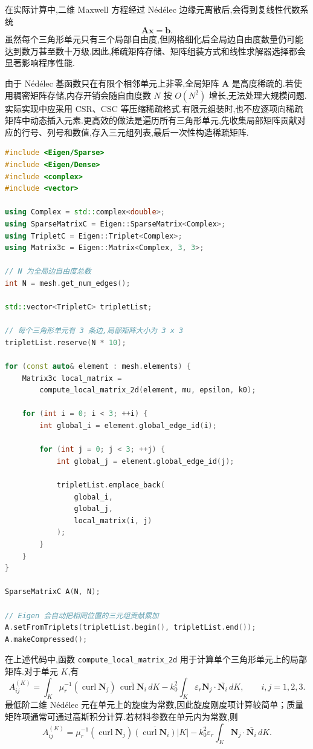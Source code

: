 \documentclass[12pt,hyperref,a4paper,UTF8,twoside]{ctexart}
\newcommand{\curl}{\operatorname{curl}}
\begin{document}
在实际计算中,二维 Maxwell 方程经过 Nédélec 边缘元离散后,会得到复线性代数系统
\[
\bm{A}\bm{x}=\bm{b}.
\]
虽然每个三角形单元只有三个局部自由度,但网格细化后全局边自由度数量仍可能达到数万甚至数十万级.因此,稀疏矩阵存储、矩阵组装方式和线性求解器选择都会显著影响程序性能.

由于 Nédélec 基函数只在有限个相邻单元上非零,全局矩阵 $\bm{A}$ 是高度稀疏的.若使用稠密矩阵存储,内存开销会随自由度数 $N$ 按 $O(N^2)$ 增长,无法处理大规模问题.实际实现中应采用 CSR、CSC 等压缩稀疏格式.有限元组装时,也不应逐项向稀疏矩阵中动态插入元素.更高效的做法是遍历所有三角形单元,先收集局部矩阵贡献对应的行号、列号和数值,存入三元组列表,最后一次性构造稀疏矩阵.

\begin{lstlisting}[language=C++, caption={基于 Eigen 库的二维 Nédélec 边缘元稀疏矩阵组装伪代码}]
#include <Eigen/Sparse>
#include <Eigen/Dense>
#include <complex>
#include <vector>

using Complex = std::complex<double>;
using SparseMatrixC = Eigen::SparseMatrix<Complex>;
using TripletC = Eigen::Triplet<Complex>;
using Matrix3c = Eigen::Matrix<Complex, 3, 3>;

// N 为全局边自由度总数
int N = mesh.get_num_edges();

std::vector<TripletC> tripletList;

// 每个三角形单元有 3 条边,局部矩阵大小为 3 x 3
tripletList.reserve(N * 10);

for (const auto& element : mesh.elements) {
    Matrix3c local_matrix =
        compute_local_matrix_2d(element, mu, epsilon, k0);

    for (int i = 0; i < 3; ++i) {
        int global_i = element.global_edge_id(i);

        for (int j = 0; j < 3; ++j) {
            int global_j = element.global_edge_id(j);

            tripletList.emplace_back(
                global_i,
                global_j,
                local_matrix(i, j)
            );
        }
    }
}

SparseMatrixC A(N, N);

// Eigen 会自动把相同位置的三元组贡献累加
A.setFromTriplets(tripletList.begin(), tripletList.end());
A.makeCompressed();
\end{lstlisting}

在上述代码中,函数 \texttt{compute\_local\_matrix\_2d} 用于计算单个三角形单元上的局部矩阵.对于单元 $K$,有
\[
A_{ij}^{(K)}
=
\int_K
\mu_r^{-1}
(\curl\bm{N}_j)\,\overline{\curl\bm{N}_i}\,dK
-
k_0^2
\int_K
\varepsilon_r
\bm{N}_j\cdot\overline{\bm{N}_i}\,dK,
\qquad i,j=1,2,3.
\]
最低阶二维 Nédélec 元在单元上的旋度为常数,因此旋度刚度项计算较简单；质量矩阵项通常可通过高斯积分计算.若材料参数在单元内为常数,则
\[
A_{ij}^{(K)}
=
\mu_r^{-1}
(\curl\bm{N}_j)\overline{(\curl\bm{N}_i)}
|K|
-
k_0^2\varepsilon_r
\int_K
\bm{N}_j\cdot\overline{\bm{N}_i}\,dK.
\]
\end{document}
